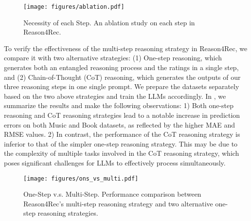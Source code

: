 \begin{figure}[t]
  \centering
  \texttt{[image: figures/ablation.pdf]}
  \caption{Necessity of each Step. An ablation study on each step in Reason4Rec.}
  \label{fig:ablation}
\end{figure}


To verify the effectiveness of the multi-step reasoning strategy in Reason4Rec, we compare it with two alternative strategies: (1) One-step reasoning, which generates both an entangled reasoning process and the ratings in a single step, and (2) Chain-of-Thought (CoT) reasoning, which generates the outputs of our three reasoning steps in one single prompt.
We prepare the datasets separately based on the two above strategies and train the LLMs accordingly. 
In ,  we summarize the results and make the following observations: 
1) Both one-step reasoning and CoT reasoning strategies lead to a notable increase in prediction errors on both Music and Book datasets, as reflected by the higher MAE and RMSE values.
2) In contrast, the performance of the CoT reasoning strategy is inferior to that of the simpler one-step reasoning strategy. This may be due to the complexity of multiple tasks involved in the CoT reasoning strategy, which poses significant challenges for LLMs to effectively process simultaneously.   



\begin{figure}[t]
  \centering
  \texttt{[image: figures/ons\_vs\_multi.pdf]}
  \caption{One-Step v.s. Multi-Step. Performance comparison between Reason4Rec's multi-step reasoning strategy and two alternative one-step reasoning strategies.}
  \label{fig:one_step}
\end{figure}

